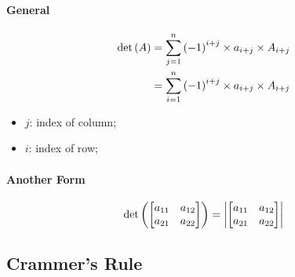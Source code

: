 \paragraph{General}

\begin{align*}
  \operatorname{det} \left( A \right)
  &= 
  \sum_{j = 1}^{n} \left( -1 \right)^{i + j} \times a_{i + j} \times A_{i + j} \\
  &=
  \sum_{i = 1}^{n} \left( -1 \right)^{i + j} \times a_{i + j} \times A_{i + j}
\end{align*}

\begin{itemize}
  \item $ j $: index of column;
  \item $ i $: index of row;
\end{itemize}

\paragraph{Another Form}

\begin{displaymath}
  \operatorname{det} 
  \left(
    \begin{bmatrix}
      a_{11} & a_{12} \\ 
      a_{21} & a_{22}
    \end{bmatrix}
  \right) 
  = 
  \left|
    \begin{bmatrix}
      a_{11} & a_{12} \\ 
      a_{21} & a_{22}
    \end{bmatrix}
  \right|
\end{displaymath}

  \subsection{Crammer's Rule}